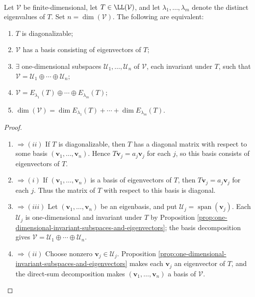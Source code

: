 \begin{theorem} \label{thm:conditions-equivalent-to-diagonalizability} \\
Let $\mathcal{V}$ be finite-dimensional, let $T\in\LL(\mathcal{V})$, and let $\lambda_1,\ldots,\lambda_m$ denote the distinct eigenvalues of $T$. Set $n=\dim(\mathcal{V})$. The following are equivalent:
\begin{enumerate}[label=(\roman*)]
\setlength{\itemsep}{0pt}
\item $T$ is diagonalizable;
\item $\mathcal{V}$ has a basis consisting of eigenvectors of $T$;
\item $\exists$ one-dimensional subspaces $\mathcal{U}_1,\ldots,\mathcal{U}_n$ of $\mathcal{V}$, each invariant under $T$, such that $\mathcal{V}=\mathcal{U}_1\oplus\cdots\oplus\mathcal{U}_n$;
\item $\mathcal{V}=E_{\lambda_1}(T)\oplus\cdots\oplus E_{\lambda_m}(T)$;
\item $\dim(\mathcal{V})=\dim E_{\lambda_1}(T)+\cdots+\dim E_{\lambda_m}(T)$.
\end{enumerate}
\begin{proof}
\begin{enumerate}[label=(\roman*).]
\setlength{\itemsep}{0pt}
\item[$(i)$]$\Rightarrow (ii)$ If $T$ is diagonalizable, then $T$ has a diagonal matrix with respect to some basis $(\mathbf{v}_1,\ldots,\mathbf{v}_n)$. Hence $T\mathbf{v}_j=a_j\mathbf{v}_j$ for each $j$, so this basis consists of eigenvectors of $T$.
\item[$(ii)$]$\Rightarrow (i)$ If $(\mathbf{v}_1,\ldots,\mathbf{v}_n)$ is a basis of eigenvectors of $T$, then $T\mathbf{v}_j=a_j\mathbf{v}_j$ for each $j$. Thus the matrix of $T$ with respect to this basis is diagonal.
\item[$(ii)$]$\Rightarrow (iii)$ Let $(\mathbf{v}_1,\ldots,\mathbf{v}_n)$ be an eigenbasis, and put $\mathcal{U}_j=\operatorname{span}(\mathbf{v}_j)$. Each $\mathcal{U}_j$ is one-dimensional and invariant under $T$ by Proposition \ref{prop:one-dimensional-invariant-subspaces-and-eigenvectors}; the basis decomposition gives $\mathcal{V}=\mathcal{U}_1\oplus\cdots\oplus\mathcal{U}_n$.
\item[$(iii)$]$\Rightarrow (ii)$ Choose nonzero $\mathbf{v}_j\in\mathcal{U}_j$. Proposition \ref{prop:one-dimensional-invariant-subspaces-and-eigenvectors} makes each $\mathbf{v}_j$ an eigenvector of $T$, and the direct-sum decomposition makes $(\mathbf{v}_1,\ldots,\mathbf{v}_n)$ a basis of $\mathcal{V}$.

\end{enumerate}
\end{proof}
\end{theorem}
